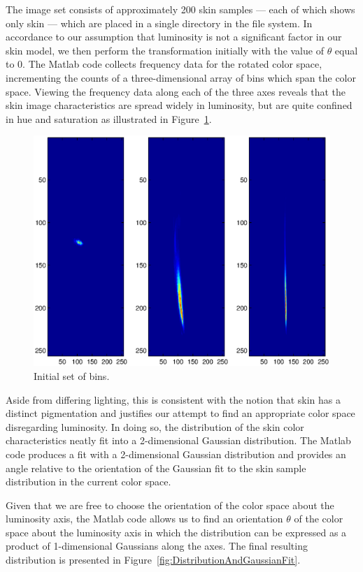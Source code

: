 The image set consists of approximately 200 skin samples --- each of which shows only skin --- which are placed in a single directory in the file system. In accordance to our assumption that luminosity is not a significant factor in our skin model, we then perform the transformation initially with the value of $\theta$ equal to 0. The Matlab code collects frequency data for the rotated color space, incrementing the counts of a three-dimensional array of bins which span the color space. Viewing the frequency data along each of the three axes reveals that the skin image characteristics are spread widely in luminosity, but are quite confined in hue and saturation as illustrated in Figure~\ref{fig:InitBins}.


\begin{figure}[h!]
  \centering
    \includegraphics[width=\textwidth]{Chapter3/Figs/InitialBins.eps}
    \caption{Initial set of bins.}  \label{fig:InitBins}
\end{figure}


Aside from differing lighting, this is consistent with the notion that skin has a distinct pigmentation and justifies our attempt to find an appropriate color space disregarding luminosity. In doing so, the distribution of the skin color characteristics neatly fit into a 2-dimensional Gaussian distribution. The Matlab code produces a fit with a 2-dimensional Gaussian distribution and provides an angle relative to the orientation of the Gaussian fit to the skin sample distribution in the current color space.

Given that we are free to choose the orientation of the color space about the luminosity axis, the Matlab code allows us to find an orientation $\theta$ of the color space about the luminosity axis in which the distribution can be expressed as a product of 1-dimensional Gaussians along the axes. The final resulting distribution is presented in Figure~\ref{fig:DistributionAndGaussianFit}.

